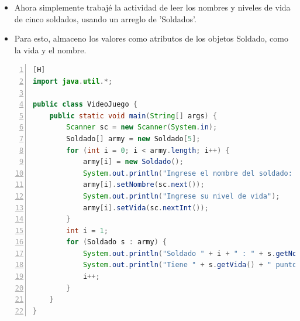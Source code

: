 \documentclass{article}
\begin{document}
	\begin{itemize}
		\item Ahora simplemente trabajé la actividad de leer los nombres y niveles de vida de cinco soldados, usando un arreglo de 'Soldados'.
		\item Para esto, almaceno los valores como atributos de los objetos Soldado, como la vida y el nombre.
	\end{itemize}
	\begin{lstlisting}[language=java,caption={Los 5 soldados}, numbers=left][H]
import java.util.*;

public class VideoJuego {
    public static void main(String[] args) {
        Scanner sc = new Scanner(System.in);
        Soldado[] army = new Soldado[5];
        for (int i = 0; i < army.length; i++) {
            army[i] = new Soldado();
            System.out.println("Ingrese el nombre del soldado: ");
            army[i].setNombre(sc.next());
            System.out.println("Ingrese su nivel de vida");
            army[i].setVida(sc.nextInt());
        }
        int i = 1;
        for (Soldado s : army) {
            System.out.println("Soldado " + i + " : " + s.getNombre());
            System.out.println("Tiene " + s.getVida() + " puntos de vida\n");
            i++;
        }
    }
}
	\end{lstlisting}
	
\end{document}
